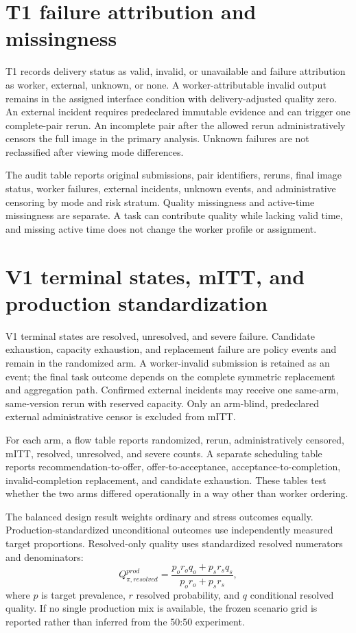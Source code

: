 \documentclass[preprint,12pt]{elsarticle}
\begin{document}
\section{T1 failure attribution and missingness}
\label{sup:t1failure}

T1 records delivery status as valid, invalid, or unavailable and failure attribution as worker, external, unknown, or none. A worker-attributable invalid output remains in the assigned interface condition with delivery-adjusted quality zero. An external incident requires predeclared immutable evidence and can trigger one complete-pair rerun. An incomplete pair after the allowed rerun administratively censors the full image in the primary analysis. Unknown failures are not reclassified after viewing mode differences.

The audit table reports original submissions, pair identifiers, reruns, final image status, worker failures, external incidents, unknown events, and administrative censoring by mode and risk stratum. Quality missingness and active-time missingness are separate. A task can contribute quality while lacking valid time, and missing active time does not change the worker profile or assignment.

\section{V1 terminal states, mITT, and production standardization}
\label{sup:v1failure}

V1 terminal states are resolved, unresolved, and severe failure. Candidate exhaustion, capacity exhaustion, and replacement failure are policy events and remain in the randomized arm. A worker-invalid submission is retained as an event; the final task outcome depends on the complete symmetric replacement and aggregation path. Confirmed external incidents may receive one same-arm, same-version rerun with reserved capacity. Only an arm-blind, predeclared external administrative censor is excluded from mITT.

For each arm, a flow table reports randomized, rerun, administratively censored, mITT, resolved, unresolved, and severe counts. A separate scheduling table reports recommendation-to-offer, offer-to-acceptance, acceptance-to-completion, invalid-completion replacement, and candidate exhaustion. These tables test whether the two arms differed operationally in a way other than worker ordering.

The balanced design result weights ordinary and stress outcomes equally. Production-standardized unconditional outcomes use independently measured target proportions. Resolved-only quality uses standardized resolved numerators and denominators:
\begin{equation}
 Q_{\pi,resolved}^{prod}=
 \frac{p_or_o q_o+p_sr_s q_s}{p_or_o+p_sr_s},
\end{equation}
where $p$ is target prevalence, $r$ resolved probability, and $q$ conditional resolved quality. If no single production mix is available, the frozen scenario grid is reported rather than inferred from the 50:50 experiment.
\end{document}
